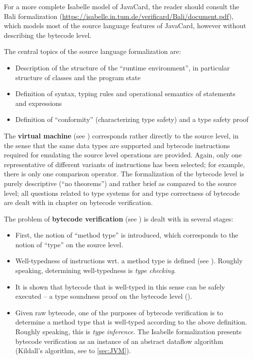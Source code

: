 For a more complete Isabelle model of JavaCard, the reader should
consult the Bali formalization
(\url{https://isabelle.in.tum.de/verificard/Bali/document.pdf}), which
models most of the source language features of JavaCard, however without
describing the bytecode level.

The central topics of the source language formalization are:
\begin{itemize}
\item Description of the structure of the ``runtime environment'', in
  particular structure of classes and the program state
\item Definition of syntax, typing rules and operational semantics of
  statements and expressions
\item Definition of ``conformity'' (characterizing type safety) and a
  type safety proof
\end{itemize}


The \mJava{} \textbf{virtual machine} (see )
corresponds rather directly to the source level, in the sense that the
same data types are supported and bytecode instructions required for
emulating the source level operations are provided. Again, only one
representative of different variants of instructions has been
selected; for example, there is only one comparison operator.  The
formalization of the bytecode level is purely descriptive (``no
theorems'') and rather brief as compared to the source level; all
questions related to type systems for and type correctness of bytecode
are dealt with in chapter on bytecode verification.

The problem of \textbf{bytecode verification} (see ) is
dealt with in several stages:
\begin{itemize}
\item First, the notion of ``method type'' is introduced, which
  corresponds to the notion of ``type'' on the source level.
\item Well-typedness of instructions wrt. a method type is defined
  (see ). Roughly speaking, determining
  well-typedness is \emph{type checking}.
\item It is shown that bytecode that is well-typed in this sense can
  be safely executed -- a type soundness proof on the bytecode level
  (). 
\item Given raw bytecode, one of the purposes of bytecode verification
  is to determine a method type that is well-typed according to the
  above definition. Roughly speaking, this is \emph{type inference}.
  The Isabelle formalization presents bytecode verification as an
  instance of an abstract dataflow algorithm (Kildall's algorithm, see
   to \ref{sec:JVM}).
\end{itemize}

